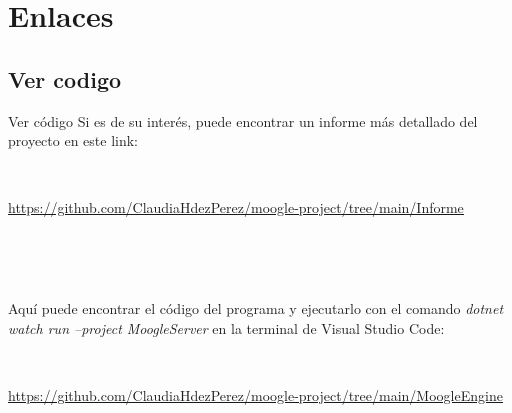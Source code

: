\section{Enlaces}

\subsection{Ver codigo}
\begin{frame}{Ver código}
    Si es de su interés, puede encontrar un informe más detallado del proyecto en este link:

    \

    \textcolor{blue}{\underline{\scriptsize {\url{https://github.com/ClaudiaHdezPerez/moogle-project/tree/main/Informe}}}}

    \

    \

    Aquí puede encontrar el código del programa y ejecutarlo con el comando \textit{dotnet watch run --project MoogleServer} en la terminal de Visual Studio Code:

    \

    \textcolor{blue}{\underline{\scriptsize {\url{https://github.com/ClaudiaHdezPerez/moogle-project/tree/main/MoogleEngine}}}}
\end{frame}
